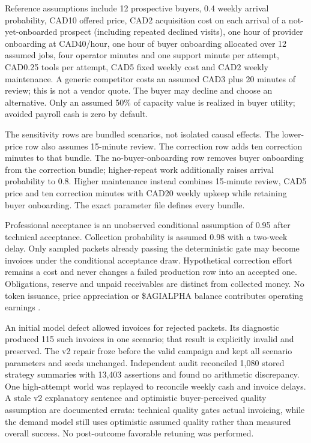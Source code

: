 \documentclass[10pt,a4paper]{article}
\begin{document}
Reference assumptions include 12 prospective buyers, 0.4 weekly arrival probability, CAD10 offered price, CAD2 acquisition cost on each arrival of a not-yet-onboarded prospect (including repeated declined visits), one hour of provider onboarding at CAD40/hour, one hour of buyer onboarding allocated over 12 assumed jobs, four operator minutes and one support minute per attempt, CAD0.25 tools per attempt, CAD5 fixed weekly cost and CAD2 weekly maintenance. A generic competitor costs an assumed CAD3 plus 20 minutes of review; this is not a vendor quote. The buyer may decline and choose an alternative. Only an assumed 50\% of capacity value is realized in buyer utility; avoided payroll cash is zero by default.

The sensitivity rows are bundled scenarios, not isolated causal effects. The lower-price row also assumes 15-minute review. The correction row adds ten correction minutes to that bundle. The no-buyer-onboarding row removes buyer onboarding from the correction bundle; higher-repeat work additionally raises arrival probability to 0.8. Higher maintenance instead combines 15-minute review, CAD5 price and ten correction minutes with CAD20 weekly upkeep while retaining buyer onboarding. The exact parameter file defines every bundle.

Professional acceptance is an unobserved conditional assumption of 0.95 after technical acceptance. Collection probability is assumed 0.98 with a two-week delay. Only sampled packets already passing the deterministic gate may become invoices under the conditional acceptance draw. Hypothetical correction effort remains a cost and never changes a failed production row into an accepted one. Obligations, reserve and unpaid receivables are distinct from collected money. No token issuance, price appreciation or \$AGIALPHA balance contributes operating earnings \cite{economicrun}.

An initial model defect allowed invoices for rejected packets. Its diagnostic produced 115 such invoices in one scenario; that result is explicitly invalid and preserved. The v2 repair froze before the valid campaign and kept all scenario parameters and seeds unchanged. Independent audit reconciled 1,080 stored strategy summaries with 13,403 assertions and found no arithmetic discrepancy. One high-attempt world was replayed to reconcile weekly cash and invoice delays. A stale v2 explanatory sentence and optimistic buyer-perceived quality assumption are documented errata: technical quality gates actual invoicing, while the demand model still uses optimistic assumed quality rather than measured overall success. No post-outcome favorable retuning was performed.
\end{document}
